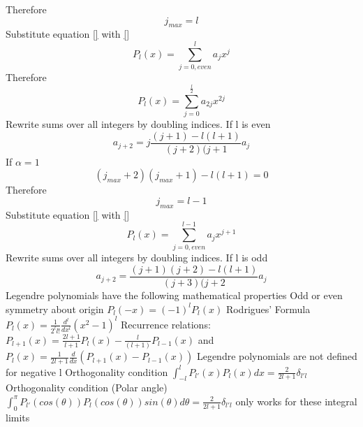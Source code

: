 \documentclass[12pt]{article}
\begin{document}
    Therefore 
    \begin{equation} \label{13-13-32}
        j_{max}=l
    \end{equation}          
    Substitute equation \ref{} with \ref{}
    \begin{equation} \label{13-13-33}
        P_l(x) = \sum_{j=0,even}^{l} a_j x^{j}
    \end{equation}      
    Therefore 
    \begin{equation} \label{13-13-34}
        P_l(x) = \sum_{j=0}^{\frac{l}{2}} a_{2j }x^{2j}
    \end{equation}    
    Rewrite sums over all integers by doubling indices. If l is even
    \begin{equation} \label{13-13-35}
        a_{j+2} = j \frac{(j+1) - l(l+1)}{(j + 2) (j + 1} a_j
    \end{equation} 
    If $\alpha = 1$
    \begin{equation} \label{13-13-36}
        (j_{max} + 2)(j_{max} + 1) - l(l+1) =0
    \end{equation} 
    Therefore
    \begin{equation} \label{13-13-37}
        j_{max}=l-1
    \end{equation} 
    Substitute equation \ref{} with \ref{}
    \begin{equation} \label{13-13-38}
        P_l(x) = \sum_{j=0,even}^{l-1} a_j x^{j+1}
    \end{equation} 
    Rewrite sums over all integers by doubling indices. If l is odd
    \begin{equation} \label{13-13-39}
        a_{j+2} = \frac{(j+1) (j+2) - l(l+1)}{(j + 3) (j + 2} a_j
    \end{equation}     
    \newline Legendre polynomials have the following mathematical properties
    \newline Odd or even symmetry about origin $P_l(-x) = (-1)^l P_l(x)$
    \newline Rodrigues' Formula $P_l(x) = \frac{1}{2^l l!} \frac{d^l}{dx^l} (x^2 - 1)^l$
    \newline Recurrence relations: $P_{l+1}(x) = \frac{2 l + 1}{l+1} P_l(x) - \frac{l}{(l+1)} P_{l-1}(x)$
    \newline and $P_l(x) = \frac{1}{2 l + 1} \frac{d}{dx} (P_{l+1}(x) - P_{l-1}(x))$
    \newline Legendre polynomials are not defined for negative l
    \newline Orthogonality condition $\int_{-l}^l P_{l'}(x) P_l(x)dx = \frac{2}{2l + 1} \delta_{l'l}$
    \newline Orthogonality condition (Polar angle) $\int_0^\pi P_{l'}(cos(\theta)) P_l(cos(\theta)) sin(\theta) d\theta = \frac{2}{2l+1}\delta_{l'l}$ only works for these integral limits
\end{document}
